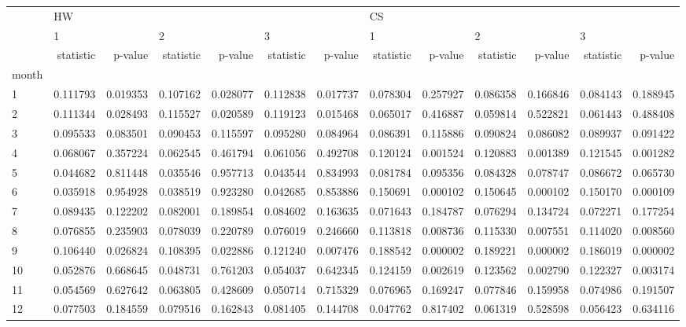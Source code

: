\begin{tabular}{lrrrrrrrrrrrr}
\toprule
{} & \multicolumn{6}{l}{HW} & \multicolumn{6}{l}{CS} \\
{} & \multicolumn{2}{l}{1} & \multicolumn{2}{l}{2} & \multicolumn{2}{l}{3} & \multicolumn{2}{l}{1} & \multicolumn{2}{l}{2} & \multicolumn{2}{l}{3} \\
{} & statistic &   p-value & statistic &   p-value & statistic &   p-value & statistic &   p-value & statistic &   p-value & statistic &   p-value \\
month &           &           &           &           &           &           &           &           &           &           &           &           \\
\midrule
1     &  0.111793 &  0.019353 &  0.107162 &  0.028077 &  0.112838 &  0.017737 &  0.078304 &  0.257927 &  0.086358 &  0.166846 &  0.084143 &  0.188945 \\
2     &  0.111344 &  0.028493 &  0.115527 &  0.020589 &  0.119123 &  0.015468 &  0.065017 &  0.416887 &  0.059814 &  0.522821 &  0.061443 &  0.488408 \\
3     &  0.095533 &  0.083501 &  0.090453 &  0.115597 &  0.095280 &  0.084964 &  0.086391 &  0.115886 &  0.090824 &  0.086082 &  0.089937 &  0.091422 \\
4     &  0.068067 &  0.357224 &  0.062545 &  0.461794 &  0.061056 &  0.492708 &  0.120124 &  0.001524 &  0.120883 &  0.001389 &  0.121545 &  0.001282 \\
5     &  0.044682 &  0.811448 &  0.035546 &  0.957713 &  0.043544 &  0.834993 &  0.081784 &  0.095356 &  0.084328 &  0.078747 &  0.086672 &  0.065730 \\
6     &  0.035918 &  0.954928 &  0.038519 &  0.923280 &  0.042685 &  0.853886 &  0.150691 &  0.000102 &  0.150645 &  0.000102 &  0.150170 &  0.000109 \\
7     &  0.089435 &  0.122202 &  0.082001 &  0.189854 &  0.084602 &  0.163635 &  0.071643 &  0.184787 &  0.076294 &  0.134724 &  0.072271 &  0.177254 \\
8     &  0.076855 &  0.235903 &  0.078039 &  0.220789 &  0.076019 &  0.246660 &  0.113818 &  0.008736 &  0.115330 &  0.007551 &  0.114020 &  0.008560 \\
9     &  0.106440 &  0.026824 &  0.108395 &  0.022886 &  0.121240 &  0.007476 &  0.188542 &  0.000002 &  0.189221 &  0.000002 &  0.186019 &  0.000002 \\
10    &  0.052876 &  0.668645 &  0.048731 &  0.761203 &  0.054037 &  0.642345 &  0.124159 &  0.002619 &  0.123562 &  0.002790 &  0.122327 &  0.003174 \\
11    &  0.054569 &  0.627642 &  0.063805 &  0.428609 &  0.050714 &  0.715329 &  0.076965 &  0.169247 &  0.077846 &  0.159958 &  0.074986 &  0.191507 \\
12    &  0.077503 &  0.184559 &  0.079516 &  0.162843 &  0.081405 &  0.144708 &  0.047762 &  0.817402 &  0.061319 &  0.528598 &  0.056423 &  0.634116 \\
\bottomrule
\end{tabular}
